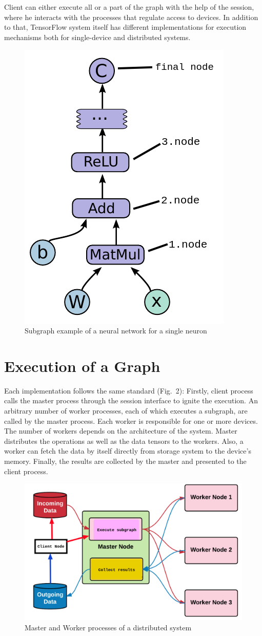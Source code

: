 \documentclass[ieeetran]{article}
\begin{document}
\\ \\Client can either execute all or a part of the graph with the help of the session, where he interacts with the processes that regulate access to devices. In addition to that, TensorFlow system itself has different implementations for execution mechanisms both for single-device and distributed systems.
\begin{figure}[h!]
  \centering
   \includegraphics[width=0.25\linewidth]{graph}
\caption[placeholder]{Subgraph example of a neural network for a single neuron}
  \label{fig:graph_caption_placeholder_subgraph_example_for_a_neural_networkfootnotemark}
\end{figure}
\section{Execution of a Graph} %
\label{sec:execution_of_a_graph}
Each implementation follows the same standard (Fig.\ 2): Firstly, client process calls the master process through the session interface to ignite the execution. An arbitrary number of worker processes, each of which executes a subgraph, are called by the master process. Each worker is responsible for one or more devices. The number of workers depends on the architecture of the system. Master distributes the operations as well as the data tensors to the workers. Also, a worker can fetch the data by itself directly from storage system to the device's memory. Finally, the results are collected by the master and presented to the client process.
\begin{figure}[h!]
  \centering
\includegraphics[width=0.5\linewidth]{executionofgraph}
 \caption[placeholder]{Master and Worker processes of a distributed system} 
  \label{fig:executionofgraph}
\end{figure}
\end{document}
